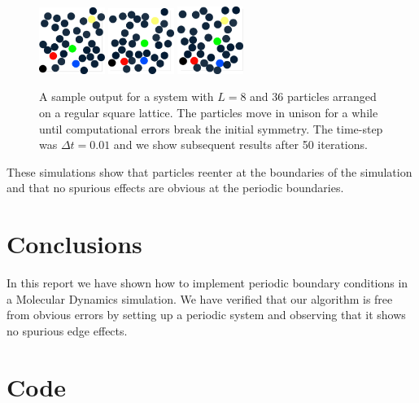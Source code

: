 \documentclass{article}
\newcommand{\includecode}[2][c]{}
\begin{document}
\begin{figure}
  \includegraphics[width=0.19\textwidth]{graph3d_026.eps}
  \includegraphics[width=0.19\textwidth]{graph3d_027.eps}
  \includegraphics[width=0.19\textwidth]{graph3d_028.eps}
\caption{\label{fig2} A sample output for a system with $L=8$ and 36 particles arranged on a regular square lattice. The particles move in unison for a while until computational errors break the initial symmetry. The time-step was $\Delta t=0.01$ and we show subsequent results after 50 iterations.}
\end{figure}

These simulations show that particles reenter at the boundaries of the simulation and that no spurious effects are obvious at the periodic boundaries.

\section{Conclusions}
In this report we have shown how to implement periodic boundary conditions in a Molecular Dynamics simulation. We have verified that our algorithm is free from obvious errors by setting up a periodic system and observing that it shows no spurious edge effects.


\appendix
\section{Code}
\end{document}
